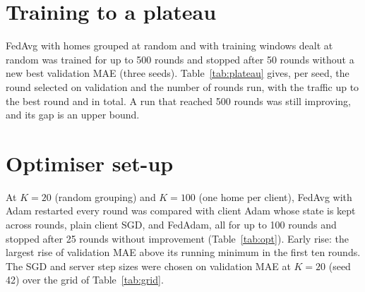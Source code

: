 \begin{table}
\caption{Best-round validation MAE (kWh) over the proximal coefficient grid.}\label{tab:tuning}

\end{table}

\section{Training to a plateau}
FedAvg with homes grouped at random and with training windows dealt at random was trained for up to 500 rounds and
stopped after 50 rounds without a new best validation MAE (three seeds). Table~\ref{tab:plateau} gives, per seed, the
round selected on validation and the number of rounds run, with the traffic up to the best round and in total. A run
that reached 500 rounds was still improving, and its gap is an upper bound.

\begin{table}
\caption{FedAvg trained to a plateau. Clients: homes grouped at random, or training windows dealt at random (IID
control). MB to best: traffic up to the selected round; MB total: traffic of the whole run (means over
seeds).}\label{tab:plateau}

\end{table}

\section{Optimiser set-up}
At $K=20$ (random grouping) and $K=100$ (one home per client), FedAvg with Adam restarted every round was compared
with client Adam whose state is kept across rounds, plain client SGD, and FedAdam, all for up to 100 rounds and
stopped after 25 rounds without improvement (Table~\ref{tab:opt}). Early rise: the largest rise of validation MAE above its running minimum
in the first ten rounds. The SGD and server step sizes were chosen on validation MAE at $K=20$ (seed 42) over the grid
of Table~\ref{tab:grid}.

\begin{table}
\caption{Optimiser set-up (FedAvg, up to 100 rounds; mean over seeds). Gap: test MAE relative to
centralised.}\label{tab:opt}

\end{table}

\begin{table}
\caption{Step-size grid (validation MAE, $K=20$ random grouping, seed 42, up to 100 rounds). Diverged: validation
error not finite.}\label{tab:grid}

\end{table}

